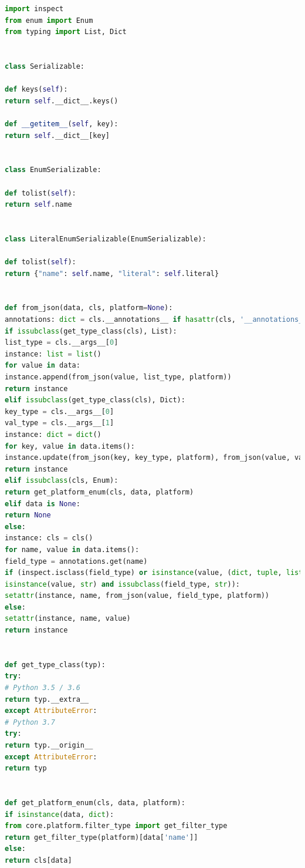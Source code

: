 \documentclass{article}
\begin{document}
\begin{lstlisting}[language=Python, caption=core.util.serializable]
import inspect
from enum import Enum
from typing import List, Dict


class Serializable:

def keys(self):
return self.__dict__.keys()

def __getitem__(self, key):
return self.__dict__[key]


class EnumSerializable:

def tolist(self):
return self.name


class LiteralEnumSerializable(EnumSerializable):

def tolist(self):
return {"name": self.name, "literal": self.literal}


def from_json(data, cls, platform=None):
annotations: dict = cls.__annotations__ if hasattr(cls, '__annotations__') else None
if issubclass(get_type_class(cls), List):
list_type = cls.__args__[0]
instance: list = list()
for value in data:
instance.append(from_json(value, list_type, platform))
return instance
elif issubclass(get_type_class(cls), Dict):
key_type = cls.__args__[0]
val_type = cls.__args__[1]
instance: dict = dict()
for key, value in data.items():
instance.update(from_json(key, key_type, platform), from_json(value, val_type, platform))
return instance
elif issubclass(cls, Enum):
return get_platform_enum(cls, data, platform)
elif data is None:
return None
else:
instance: cls = cls()
for name, value in data.items():
field_type = annotations.get(name)
if (inspect.isclass(field_type) or isinstance(value, (dict, tuple, list, set, frozenset))) and not (
isinstance(value, str) and issubclass(field_type, str)):
setattr(instance, name, from_json(value, field_type, platform))
else:
setattr(instance, name, value)
return instance


def get_type_class(typ):
try:
# Python 3.5 / 3.6
return typ.__extra__
except AttributeError:
# Python 3.7
try:
return typ.__origin__
except AttributeError:
return typ


def get_platform_enum(cls, data, platform):
if isinstance(data, dict):
from core.platform.filter_type import get_filter_type
return get_filter_type(platform)[data['name']]
else:
return cls[data]
\end{lstlisting}
\end{document}
